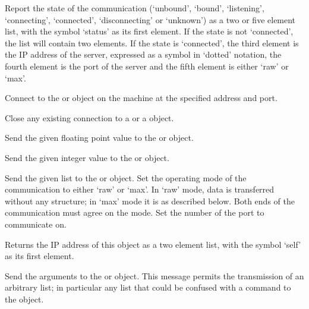


\objItemCommands[]

  \objListCmdBegin

  Report the state of the communication (`unbound', `bound', `listening', `connecting',
  `connected', `disconnecting' or `unknown') as a two or five element list, with the symbol
  `status' as its first element.
  If the state is not `connected', the list will contain two elements.
  If the state is `connected', the third element is the IP address of the server, expressed as a
  symbol in `dotted' notation, the fourth element is the port of the server and the fifth element is either
  `raw' or `max'.

  Connect to the  or  object on the machine at the
  specified address and port.

  Close any existing connection to a  or a  object.

  Send the given floating point value to the  or  object.

  Send the given integer value to the  or  object.

  Send the given list to the  or  object.
  Set the operating mode of the communication to either `raw' or `max'.
  In `raw' mode, data is transferred without any structure; in `max' mode it is as described below.
  Both ends of the communication must agree on the mode.
  Set the number of the port to communicate on.

  Returns the IP address of this object as a two element list, with the symbol `self' as its first
  element.
  
  Send the arguments to the  or  object.
  This message permits the transmission of an arbitrary list; in particular any list that could be
  confused with a command to the  object.

